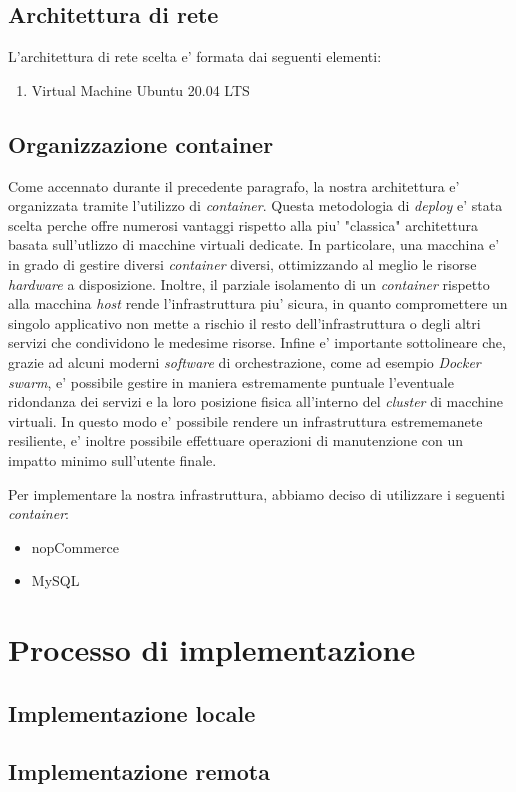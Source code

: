 \documentclass[a4paper]{report}
\begin{document}
	\section{Architettura di rete}
		L'architettura di rete scelta e' formata dai seguenti elementi:
		\begin{enumerate}
			\item Virtual Machine Ubuntu 20.04 LTS
		\end{enumerate}
	\section{Organizzazione container}
		Come accennato durante il precedente paragrafo, la nostra architettura e' organizzata tramite l'utilizzo di
		\emph{container}. Questa metodologia di  \emph{deploy} e' stata scelta perche offre numerosi vantaggi rispetto
		alla piu' "classica" architettura basata sull'utlizzo di macchine virtuali dedicate. In particolare, una
		macchina e' in grado di gestire diversi \emph{container} diversi, ottimizzando al meglio le risorse
		\emph{hardware} a disposizione. Inoltre, il parziale isolamento di un \emph{container} rispetto alla macchina
		\emph{host} rende l'infrastruttura piu' sicura, in quanto compromettere un singolo applicativo non mette a
		rischio il resto dell'infrastruttura o degli altri servizi che condividono le medesime risorse.
		Infine e' importante sottolineare che, grazie ad alcuni moderni \emph{software} di orchestrazione, come ad
		esempio \emph{Docker swarm}, e' possibile gestire in maniera estremamente puntuale l'eventuale ridondanza dei
		servizi e la loro posizione fisica all'interno del \emph{cluster} di macchine virtuali.
		In questo modo e' possibile rendere un infrastruttura estrememanete resiliente, e' inoltre possibile
		effettuare operazioni di manutenzione con un impatto minimo sull'utente finale.

		Per implementare la nostra infrastruttura, abbiamo deciso di utilizzare i seguenti \emph{container}:
		\begin{itemize}
			\item nopCommerce
			\item MySQL
		\end{itemize}

\chapter{Processo di implementazione}
	\section{Implementazione locale}
	\section{Implementazione remota}
\end{document}
